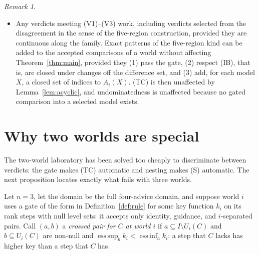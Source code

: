 \documentclass[11pt]{article}
\theoremstyle{definition}\newtheorem{definition}[theorem]{Definition}
\theoremstyle{remark}\newtheorem{remark}[theorem]{Remark}
\newcommand{\on}{\mathrm{on}}
\newcommand{\off}{\mathrm{off}}
\newcommand{\esssup}{\operatorname*{ess\,sup}}
\newcommand{\essinf}{\operatorname*{ess\,inf}}
\begin{document}
\begin{remark}
\begin{itemize}[leftmargin=*,itemsep=2pt]
\emph{continuum} of keys, low keys first: $X$ is strictly better than $Y$ when
some $\{k<c\}$ meets $T^\on_i(X,Y)$ in a non-null set and $T^\off_i(X,Y)$ in a
null set. It is not lexicographic over countably many additive criteria, but
only for the trivial reason that such orders are complete and these worlds are
not. Whether the write-up's lexicographic exclusions apply to sub-relations of
a lexicographic order has not been examined.
\item Any verdicts meeting (V1)--(V3) work, including verdicts selected from
the disagreement in the sense of the five-region construction, provided they
are continuous along the family. Exact patterns of the five-region kind can
be added to the accepted comparisons of a world without affecting
Theorem~\ref{thm:main}, provided they (1) pass the gate, (2) respect (IB), that
is, are closed under changes off the difference set, and (3) add, for each
model $X$, a closed set of indices to $A_i(X)$. (TC) is then unaffected by
Lemma~\ref{lem:acyclic}, and undominatedness is unaffected because no gated
comparison into a selected model exists.
\end{itemize}
\end{remark}

\section{Why two worlds are special}\label{sec:three}

The two-world laboratory has been solved too cheaply to discriminate between
verdicts: the gate makes (TC) automatic and nesting makes (S) automatic. The
next proposition locates exactly what fails with three worlds.

Let $n=3$, let the domain be the full four-advice domain, and suppose world $i$
uses a gate of the form in Definition~\ref{def:rule} for some key function
$k_i$ on its rank steps with null level sets: it accepts only identity,
guidance, and $i$-separated pairs. Call $(a,b)$ a \emph{crossed pair for $C$ at
world $i$} if $a\subseteq I\setminus U_i(C)$ and $b\subseteq U_i(C)$ are
non-null and $\esssup_bk_i<\essinf_ak_i$: a step that $C$ lacks has higher key
than a step that $C$ has.
\end{document}
